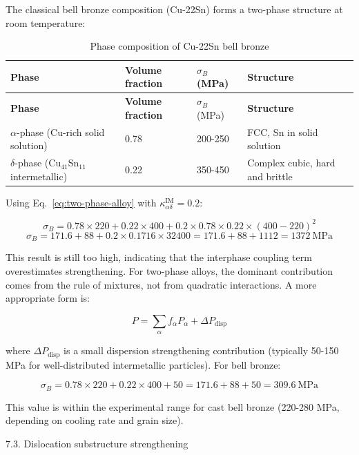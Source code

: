 \documentclass[12pt,a4paper]{article}
\begin{document}
	The classical bell bronze composition (Cu-22Sn) forms a two-phase structure at room temperature:
	
	\begin{longtable}{p{3.5cm}p{3.0cm}p{3.0cm}p{4cm}}
		\caption{Phase composition of Cu-22Sn bell bronze} \label{tab:cu-sn-phases} \\
		\toprule
		\textbf{Phase} & \textbf{Volume fraction} & \(\sigma_B\) (MPa) & \textbf{Structure} \\
		\midrule
		\endfirsthead
		\toprule
		\textbf{Phase} & \textbf{Volume fraction} & \(\sigma_B\) (MPa) & \textbf{Structure} \\
		\midrule
		\endhead
		\(\alpha\)-phase (Cu-rich solid solution) & 0.78 & 200-250 & FCC, Sn in solid solution \\
		\(\delta\)-phase (Cu\(_{41}\)Sn\(_{11}\) intermetallic) & 0.22 & 350-450 & Complex cubic, hard and brittle \\
		\bottomrule
	\end{longtable}
	
	Using Eq.~\eqref{eq:two-phase-alloy} with \(\kappa_{\alpha\delta}^{\text{IM}} = 0.2\):
	
	\[
	\sigma_B = 0.78 \times 220 + 0.22 \times 400 + 0.2 \times 0.78 \times 0.22 \times (400 - 220)^2
	\]
	\[
	\sigma_B = 171.6 + 88 + 0.2 \times 0.1716 \times 32400 = 171.6 + 88 + 1112 = 1372\ \text{MPa}
	\]
	
	This result is still too high, indicating that the interphase coupling term overestimates strengthening. For two-phase alloys, the dominant contribution comes from the rule of mixtures, not from quadratic interactions. A more appropriate form is:
	
	\begin{equation}
		\boxed{P = \sum_{\alpha} f_{\alpha} P_{\alpha} + \Delta P_{\text{disp}}}
		\label{eq:two-phase-simple}
	\end{equation}
	
	where \(\Delta P_{\text{disp}}\) is a small dispersion strengthening contribution (typically 50-150 MPa for well-distributed intermetallic particles). For bell bronze:
	
	\[
	\sigma_B = 0.78 \times 220 + 0.22 \times 400 + 50 = 171.6 + 88 + 50 = 309.6\ \text{MPa}
	\]
	
	This value is within the experimental range for cast bell bronze (220-280 MPa, depending on cooling rate and grain size).
	
	7.3. Dislocation substructure strengthening
	
\end{document}
